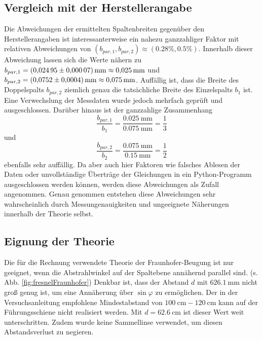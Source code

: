 \subsection{Vergleich mit der Herstellerangabe}
Die Abweichungen der ermittelten Spaltenbreiten gegenüber den Herstellerangaben ist interessanterweise ein nahezu ganzzahliger Faktor mit relativen Abweichungen von
$(b_{par, 1}, b_{par, 2}) \approx (0.28\%, 0.5\%)$. Innerhalb dieser Abweichung lassen sich die Werte nähern zu $b_{par, 1} = \SI{0.02495 \pm 0.00007}{\milli\meter} \approx \SI{0.025}{\milli\meter}$ und
$b_{par, 2} = \SI{0.0752 \pm 0.0004}{\milli\meter} \approx \SI{0.075}{\milli\meter}$.
Auffällig ist, dass die Breite des Doppelspalts $b_{par, 2}$ ziemlich genau die tatsächliche Breite des Einzelspalts $b_1$ ist.
Eine Verwechslung der Messdaten wurde jedoch mehrfach geprüft und ausgeschlossen.
Darüber hinaus ist der ganzzahlige Zusammenhang 
\begin{equation*}
    \dfrac{b_{par, 1}}{b_1} = \dfrac{\SI{0.025}{\milli\meter}}{\SI{0.075}{\milli\meter}} = \frac{1}{3}
\end{equation*}
und
\begin{equation*}
    \dfrac{b_{par, 2}}{b_2} = \dfrac{\SI{0.075}{\milli\meter}}{\SI{0.15}{\milli\meter}} = \frac{1}{2}
\end{equation*}
ebenfalls sehr auffällig. Da aber auch hier Faktoren wie falsches Ablesen der Daten oder unvollständige Überträge der Gleichungen in ein Python-Programm ausgeschlossen werden können,
werden diese Abweichungen als Zufall angenommen.
Genau genommen entstehen diese Abweichungen sehr wahrscheinlich durch Messungenauigkeiten und ungeeignete Näherungen innerhalb der Theorie selbst. \\

\subsection{Eignung der Theorie}
Die für die Rechnung verwendete Theorie der Fraunhofer-Beugung ist nur geeignet, wenn die Abstrahlwinkel auf der Spaltebene annähernd parallel sind. (s. Abb. \ref{fig:fresnelFraunhofer})
Denkbar ist, dass der Abstand $d$ mit $\SI{626.1}{\milli\meter}$ nicht groß genug ist, um eine Annäherung über $\sin{\varphi}$ zu ermöglichen.
Der in der Versuchsanleitung empfohlene Mindestabstand von $\SI{100}{\centi\meter} - \SI{120}{\centi\meter}$ kann auf der Führungsschiene nicht realisiert werden.
Mit $d = \SI{62.6}{\centi\meter}$ ist dieser Wert weit unterschritten. Zudem wurde keine Sammellinse verwendet, um diesen Abstandsverlust zu negieren.


